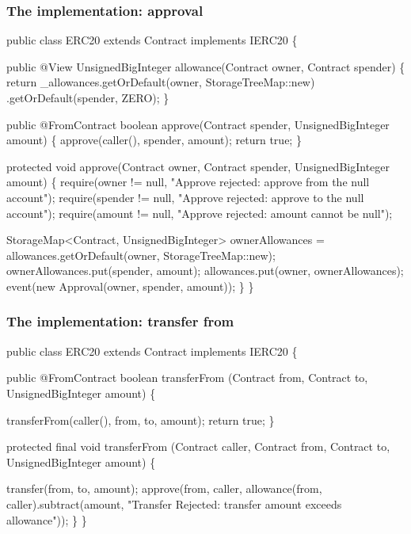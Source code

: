 \documentclass[11pt]{beamer}  %
\def\codesize{\smaller}
\def\<#1>{\codeid{#1}}
\newcommand{\codeid}[1]{\ifmmode{\mbox{\codesize\ttfamily{#1}}}\else{\codesize\ttfamily #1}\fi}
\begin{document}
\begin{frame}[fragile]\frametitle{The \<ERC20> implementation: approval}

{\scriptsize\begin{semiverbatim}
public class ERC20 {\color{red}extends Contract implements IERC20} \{

  public {\color{red}@View} UnsignedBigInteger allowance(Contract owner, Contract spender) \{
    return _allowances.getOrDefault(owner, StorageTreeMap::new)
                           .getOrDefault(spender, ZERO);
  \}

  public {\color{red}@FromContract} boolean approve(Contract spender, UnsignedBigInteger amount) \{
    approve(caller(), spender, amount);
    return true;
  \}

  protected void approve(Contract owner, Contract spender, UnsignedBigInteger amount) \{
    {\color{armygreen}require(owner != null, "Approve rejected: approve from the null account");
    require(spender != null, "Approve rejected: approve to the null account");
    require(amount != null, "Approve rejected: amount cannot be null");}

    StorageMap<Contract, UnsignedBigInteger> ownerAllowances
      = allowances.getOrDefault(owner, StorageTreeMap::new);
    ownerAllowances.put(spender, amount);
    allowances.put(owner, ownerAllowances);
    {\color{red}event(new Approval(owner, spender, amount));}
  \}
\}
\end{semiverbatim}}

\end{frame}

\begin{frame}[fragile]\frametitle{The \<ERC20> implementation: transfer from}

{\scriptsize\begin{semiverbatim}
public class ERC20 {\color{red}extends Contract implements IERC20} \{

  public {\color{red}@FromContract} boolean transferFrom
            (Contract from, Contract to, UnsignedBigInteger amount) \{

    transferFrom(caller(), from, to, amount);
    return true;
  \}

  protected final void transferFrom
        (Contract caller, Contract from, Contract to, UnsignedBigInteger amount) \{

    transfer(from, to, amount);
    approve(from, caller, allowance(from, caller).subtract(amount,
      {\color{armygreen}"Transfer Rejected: transfer amount exceeds allowance"}));
  \}
\}
\end{semiverbatim}}

\end{frame}
\end{document}
